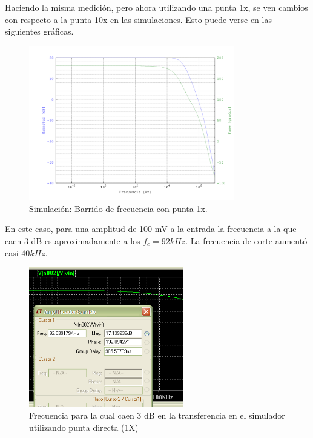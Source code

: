 Haciendo la misma medición, pero ahora utilizando una punta 1x, se ven cambios con respecto a la punta 10x en las simulaciones. Esto puede verse en las siguientes gráficas.\\

\begin{figure}[H]
  \centering      \includegraphics[width=0.8\textwidth]{gfxhernan/FIG_barrido_V_100_punta1x.png}
  \caption{Simulación: Barrido de frecuencia con punta 1x.}
\end{figure}

En este caso, para una amplitud de 100 mV a la entrada la frecuencia a la que caen 3 dB es aproximadamente a los $f_{c} = 92 kHz$. La frecuencia de corte aumentó casi $40kHz$.


\begin{figure}[H]
  \centering      \includegraphics[width=0.6\textwidth]{gfxhernan/barrido3.PNG}
  \caption{Frecuencia para la cual caen 3 dB en la transferencia en el simulador utilizando punta directa (1X)}
\end{figure}

